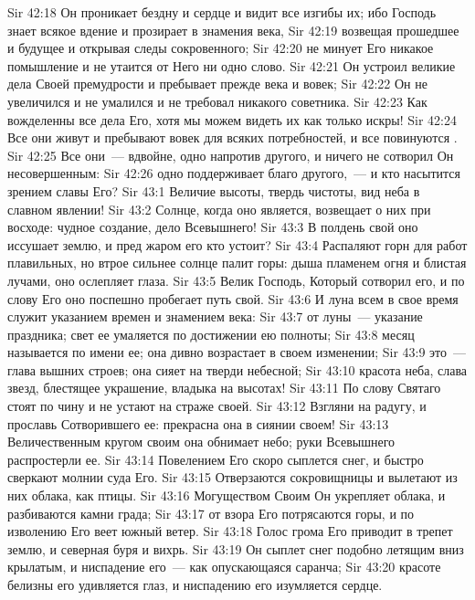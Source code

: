 \vs Sir 42:18 Он проникает бездну и сердце и видит все изгибы их; ибо Господь знает всякое вдение и прозирает в знамения века,
\vs Sir 42:19 возвещая прошедшее и будущее и открывая следы сокровенного;
\vs Sir 42:20 не минует Его никакое помышление и не утаится от Него ни одно слово.
\vs Sir 42:21 Он устроил великие дела Своей премудрости и пребывает прежде века и вовек;
\vs Sir 42:22 Он не увеличился и не умалился и не требовал никакого советника.
\vs Sir 42:23 Как вожделенны все дела Его, хотя мы можем видеть их как только искры!
\vs Sir 42:24 Все они живут и пребывают вовек для всяких потребностей, и все повинуются .
\vs Sir 42:25 Все они~--- вдвойне, одно напротив другого, и ничего не сотворил Он несовершенным:
\vs Sir 42:26 одно поддерживает благо другого,~--- и кто насытится зрением славы Его?
\vs Sir 43:1 Величие высоты, твердь чистоты, вид неба в славном явлении!
\vs Sir 43:2 Солнце, когда оно является, возвещает о них при восходе: чудное создание, дело Всевышнего!
\vs Sir 43:3 В полдень свой оно иссушает землю, и пред жаром его кто устоит?
\vs Sir 43:4 Распаляют горн для работ плавильных, но втрое сильнее солнце палит горы: дыша пламенем огня и блистая лучами, оно ослепляет глаза.
\vs Sir 43:5 Велик Господь, Который сотворил его, и по слову Его оно поспешно пробегает путь свой.
\vs Sir 43:6 И луна всем в свое время служит указанием времен и знамением века:
\vs Sir 43:7 от луны~--- указание праздника; свет ее умаляется по достижении ею полноты;
\vs Sir 43:8 месяц называется по имени ее; она дивно возрастает в своем изменении;
\vs Sir 43:9 это~--- глава вышних строев; она сияет на тверди небесной;
\vs Sir 43:10 красота неба, слава звезд, блестящее украшение, владыка на высотах!
\vs Sir 43:11 По слову Святаго  стоят по чину и не устают на страже своей.
\vs Sir 43:12 Взгляни на радугу, и прославь Сотворившего ее: прекрасна она в сиянии своем!
\vs Sir 43:13 Величественным кругом своим она обнимает небо; руки Всевышнего распростерли ее.
\vs Sir 43:14 Повелением Его скоро сыплется снег, и быстро сверкают молнии суда Его.
\vs Sir 43:15 Отверзаются сокровищницы и вылетают из них облака, как птицы.
\vs Sir 43:16 Могуществом Своим Он укрепляет облака, и разбиваются камни града;
\vs Sir 43:17 от взора Его потрясаются горы, и по изволению Его веет южный ветер.
\vs Sir 43:18 Голос грома Его приводит в трепет землю, и северная буря и вихрь.
\vs Sir 43:19 Он сыплет снег подобно летящим вниз крылатым, и ниспадение его~--- как опускающаяся саранча;
\vs Sir 43:20 красоте белизны его удивляется глаз, и ниспадению его изумляется сердце.
